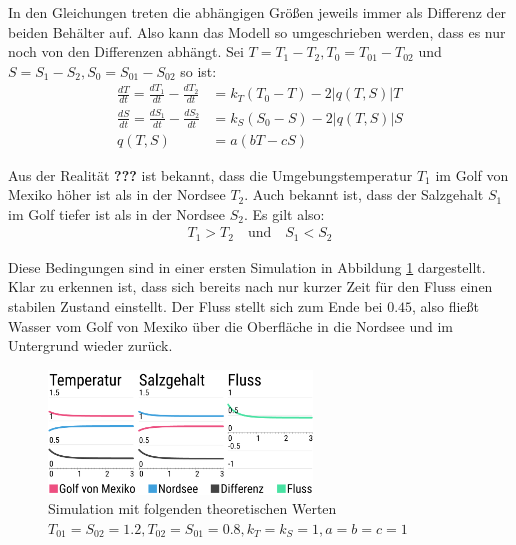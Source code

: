 \documentclass[a4paper,twoside]{article}
\begin{document}
	 In den Gleichungen treten die abhängigen Größen jeweils immer als Differenz der beiden Behälter auf. Also kann das Modell so umgeschrieben werden, dass es nur noch von den Differenzen abhängt. Sei \(T = T_1 - T_2, T_0 = T_{01} - T_{02}\) und \(S = S_1 - S_2, S_0 = S_{01} - S_{02}\)  so ist:
	 \begin{align*}
	 	\frac{dT}{dt} = \frac{dT_1}{dt} - \frac{dT_2}{dt} &= k_T\left(T_{0} - T\right) - 2\left|q(T,S)\right|T \\
	 	\frac{dS}{dt} = \frac{dS_1}{dt} - \frac{dS_2}{dt} &= k_S\left(S_{0} - S\right) - 2\left|q(T,S)\right|S \\
	 	q(T,S) &= a\left(bT - cS\right)
	 \end{align*}
	  
	Aus der Realität \textbf{???} ist bekannt, dass die Umgebungstemperatur \(T_1\) im Golf von Mexiko höher ist als in der Nordsee \(T_2\). Auch bekannt ist, dass der Salzgehalt \(S_1\) im Golf tiefer ist als in der Nordsee \(S_2\). Es gilt also:
	\begin{align*}
		T_1 > T_2 \quad \textrm{und} \quad S_1 < S_2
	\end{align*}
	
	Diese Bedingungen sind in einer ersten Simulation in Abbildung \ref{fig:modell_q_pos} dargestellt. Klar zu erkennen ist, dass sich bereits nach nur kurzer Zeit für den Fluss einen stabilen Zustand einstellt. Der Fluss stellt sich zum Ende bei \(0.45\), also fließt Wasser vom Golf von Mexiko über die Oberfläche in die Nordsee und im Untergrund wieder zurück.
	
	\begin{figure}[!h]
  		\centering
 		\includegraphics[width=7cm]{../Diagramme/temp-salt-flow_q-pos.png}
  		\caption{Simulation mit folgenden theoretischen Werten \(T_{01} = S_{02} = 1.2, T_{02} = S_{01} = 0.8, k_T = k_S = 1, a = b = c = 1\)}
  		\label{fig:modell_q_pos}
	\end{figure}
	
\end{document}
